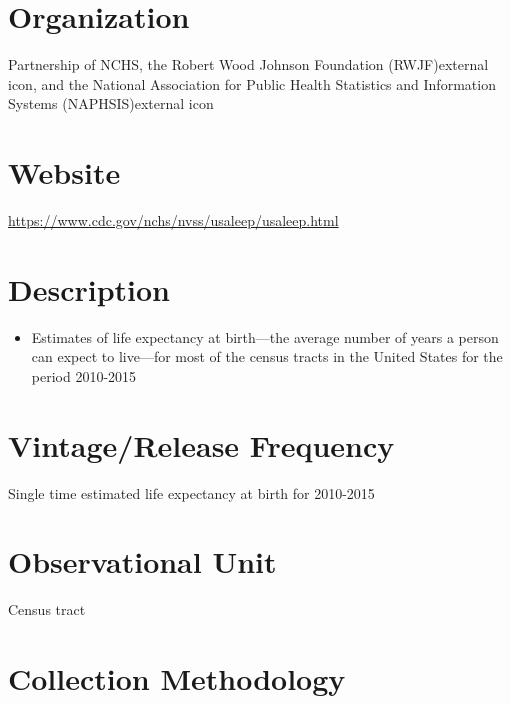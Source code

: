 \documentclass[
]{book}
\providecommand{\tightlist}{%
  \setlength{\itemsep}{0pt}\setlength{\parskip}{0pt}}
\begin{document}
\hypertarget{organization-95}{%
\section{Organization}\label{organization-95}}

Partnership of NCHS, the Robert Wood Johnson Foundation (RWJF)external icon, and the National Association for Public Health Statistics and Information Systems (NAPHSIS)external icon

\hypertarget{website-95}{%
\section{Website}\label{website-95}}

\url{https://www.cdc.gov/nchs/nvss/usaleep/usaleep.html}

\hypertarget{description-95}{%
\section{Description}\label{description-95}}

\begin{itemize}
\tightlist
\item
  Estimates of life expectancy at birth---the average number of years a person can expect to live---for most of the census tracts in the United States for the period 2010-2015
\end{itemize}

\hypertarget{vintagerelease-frequency-95}{%
\section{Vintage/Release Frequency}\label{vintagerelease-frequency-95}}

Single time estimated life expectancy at birth for 2010-2015

\hypertarget{observational-unit-95}{%
\section{Observational Unit}\label{observational-unit-95}}

Census tract

\hypertarget{collection-methodology-95}{%
\section{Collection Methodology}\label{collection-methodology-95}}
\end{document}
